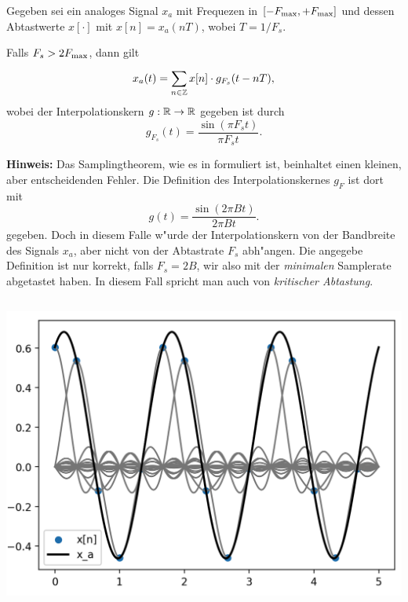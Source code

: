 \begin{Thm}[Samplingtheorem]\label{stm:sampling_theorem}
Gegeben sei ein analoges Signal $x_a$ mit Frequezen in $[-F_{\rm max},+F_{\rm max}]$ und dessen Abtastwerte $x[\cdot]$ mit $x[n] = x_a(nT)$, wobei $T = 1/F_s$.

Falls $F_s > 2 F_{\rm max}$, dann gilt
\begin{equation}\label{eq:sampling_theorem}
    x_a(t) = {\sum\limits_{n \in \mathbb{Z}}^{}{
        x[n] \cdot g_{F_s}(t - n T),
    }}
\end{equation}
wobei der Interpolationskern $g : \mathbb{R} \rightarrow \mathbb{R}$ gegeben ist durch
\[
g_{F_s}(t) = \frac{\sin(\pi F_s t)}{\pi F_s t}.
\]
\end{Thm}

\textbf{Hinweis:} Das Samplingtheorem, wie es in \cite{proakis2013} formuliert ist, beinhaltet einen kleinen, aber entscheidenden Fehler. Die Definition des Interpolationskernes $g_F$ ist dort mit
\[
g(t) = \frac{\sin(2 \pi B t)}{2 \pi B t}.
\]
gegeben. 
Doch in diesem Falle w"urde der Interpolationskern von der Bandbreite des Signals $x_a$, aber nicht von der Abtastrate $F_s$ abh"angen. 
Die angegebe Definition ist nur korrekt, falls $F_s = 2 B$, wir also mit der \emph{minimalen} Samplerate abgetastet haben.
In diesem Fall spricht man auch von \emph{kritischer Abtastung}.
%
\begin{listing}
    \begin{minipage}{0.49\textwidth}
        \strut\vspace*{-\baselineskip}\newline
        \inputminted[firstline=4]{python3}{code/sampling_theorem.py}
    \end{minipage}
    \begin{minipage}{0.49\textwidth}
        \strut\vspace*{-\baselineskip}\newline
        \includegraphics[width=\textwidth]{code/sampling_theorem.png}
    \end{minipage}
    \label{py:sampling_theorem}
\end{listing}

